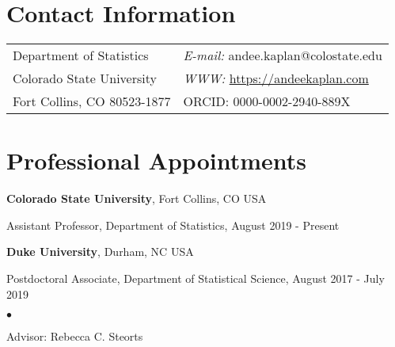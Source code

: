 \documentclass[margin,line]{res}
\newenvironment{list1}{
  \begin{list}{\ding{113}}{%
      \setlength{\itemsep}{0in}
      \setlength{\parsep}{0in} \setlength{\parskip}{0in}
      \setlength{\topsep}{0in} \setlength{\partopsep}{0in}
      \setlength{\leftmargin}{0.17in}}}{\end{list}}
\newenvironment{list2}{
  \begin{list}{$\bullet$}{%
      \setlength{\itemsep}{0in}
      \setlength{\parsep}{0in} \setlength{\parskip}{0in}
      \setlength{\topsep}{0in} \setlength{\partopsep}{0in}
      \setlength{\leftmargin}{0.2in}}}{\end{list}}
\begin{document}
\nocite{*}

\begin{resume}

\section{\sc Contact Information}
\vspace{.05in}
\begin{tabular}{@{}p{2in}p{4in}}
Department of Statistics  & {\it E-mail:} andee.kaplan@colostate.edu\\
Colorado State University &  {\it WWW:} \url{https://andeekaplan.com} \\
Fort Collins, CO 80523-1877 & ORCID: 0000-0002-2940-889X\\
\end{tabular}

\section{\sc Professional Appointments}
{\bf Colorado State University}, Fort Collins, CO USA\\
\vspace*{-.1in}
\begin{list1}
\item[] Assistant Professor, Department of Statistics, August 2019 - Present
\end{list1}

{\bf Duke University}, Durham, NC USA\\
\vspace*{-.1in}
\begin{list1}
\item[] Postdoctoral Associate, Department of Statistical Science, August 2017 - July 2019
\begin{list2}
\vspace*{.05in}
\item[] Advisor: Rebecca C. Steorts
\end{list2}
\end{list1}


\end{resume}
\end{document}
